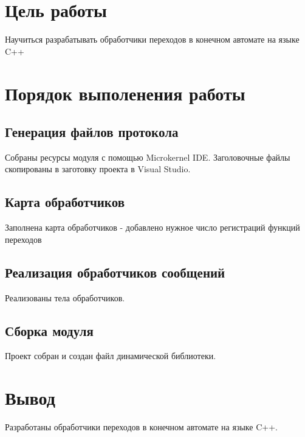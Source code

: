 \section{Цель работы}
	Научиться разрабатывать обработчики переходов в конечном автомате на языке C++
		
\section{Порядок выполенения работы}
	\subsection{Генерация файлов протокола}
		Собраны ресурсы модуля с помощью  Microkernel IDE. Заголовочные файлы скопированы в заготовку проекта в Visual Studio.
		
		
		
	\subsection{Карта обработчиков}
		Заполнена карта обработчиков - добавлено нужное число регистраций функций переходов
		
		
	\subsection{Реализация обработчиков сообщений}
		Реализованы тела обработчиков.
		
	
	\subsection{Сборка модуля}
		Проект собран и создан файл динамической библиотеки.
		

\section{Вывод}
	Разработаны обработчики переходов в конечном автомате на языке C++.